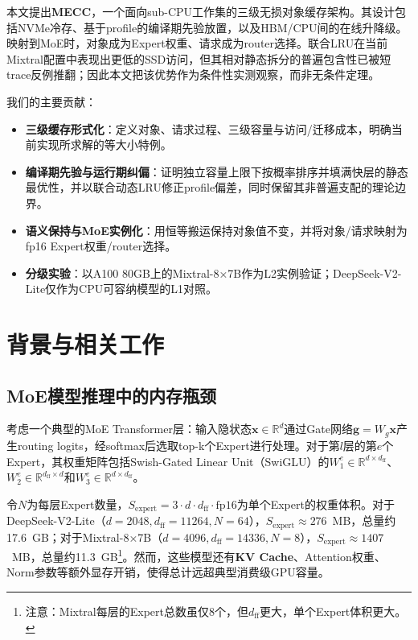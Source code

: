 \documentclass[11pt,a4paper]{article}
\begin{document}
本文提出\textbf{MECC}，一个面向sub-CPU工作集的三级无损对象缓存架构。其设计包括NVMe冷存、基于profile的编译期先验放置，以及HBM/CPU间的在线升降级。映射到MoE时，对象成为Expert权重、请求成为router选择。联合LRU在当前Mixtral配置中表现出更低的SSD访问，但其相对静态拆分的普遍包含性已被短trace反例推翻；因此本文把该优势作为条件性实测观察，而非无条件定理。

我们的主要贡献：
\begin{itemize}
    \item \textbf{三级缓存形式化}：定义对象、请求过程、三级容量与访问/迁移成本，明确当前实现所求解的等大小特例。
    \item \textbf{编译期先验与运行期纠偏}：证明独立容量上限下按概率排序并填满快层的静态最优性，并以联合动态LRU修正profile偏差，同时保留其非普遍支配的理论边界。
    \item \textbf{语义保持与MoE实例化}：用恒等搬运保持对象值不变，并将对象/请求映射为fp16 Expert权重/router选择。
    \item \textbf{分级实验}：以A100 80GB上的Mixtral-8×7B作为L2实例验证；DeepSeek-V2-Lite仅作为CPU可容纳模型的L1对照。
\end{itemize}

\section{背景与相关工作}

\subsection{MoE模型推理中的内存瓶颈}

考虑一个典型的MoE Transformer层：输入隐状态$\mathbf{x}\in\mathbb{R}^{d}$通过Gate网络$\mathbf{g}=W_g\mathbf{x}$产生routing logits，经softmax后选取top-k个Expert进行处理。对于第$l$层的第$e$个Expert，其权重矩阵包括Swish-Gated Linear Unit（SwiGLU）的$W_1^e\in\mathbb{R}^{d\times d_{\text{ff}}}$、$W_2^e\in\mathbb{R}^{d_{\text{ff}}\times d}$和$W_3^e\in\mathbb{R}^{d\times d_{\text{ff}}}$。

令$N$为每层Expert数量，$S_{\text{expert}}=3\cdot d\cdot d_{\text{ff}}\cdot \text{fp16}$为单个Expert的权重体积。对于DeepSeek-V2-Lite（$d=2048, d_{\text{ff}}=11264, N=64$），$S_{\text{expert}}\approx 276$~MB，总量约17.6~GB；对于Mixtral-8×7B（$d=4096, d_{\text{ff}}=14336, N=8$），$S_{\text{expert}}\approx 1407$~MB，总量约11.3~GB\footnote{注意：Mixtral每层的Expert总数虽仅8个，但$d_{\text{ff}}$更大，单个Expert体积更大。}。然而，这些模型还有\textbf{KV Cache}、Attention权重、Norm参数等额外显存开销，使得总计远超典型消费级GPU容量。
\end{document}
